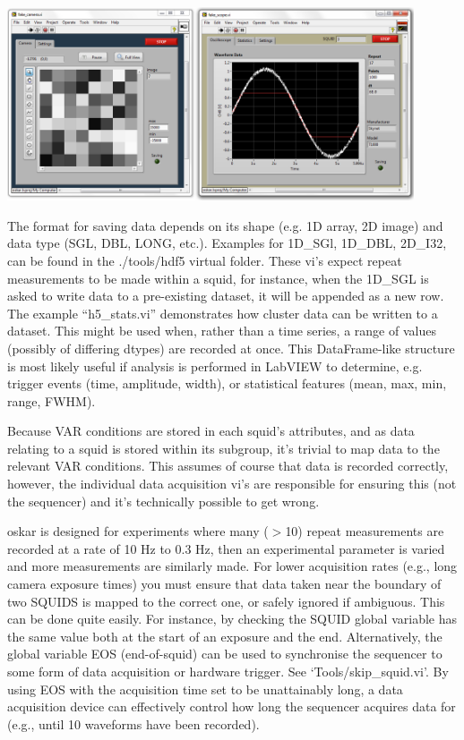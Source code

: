 \documentclass[10pt,a4paper]{article}
\newenvironment{warning}[1]{%
	\tcolorbox[beamer,%
	breakable,
	colback=white,colframe=DarkRed,%
	title=Warning:]}%
{\endtcolorbox}
\begin{document}
\includegraphics[width=0.9\textwidth]{images/DAQ.png}

The format for saving data depends on its shape (e.g. 1D array, 2D image) and data type (SGL, DBL, LONG, etc.).  Examples for 1D\_SGl, 1D\_DBL, 2D\_I32, can be found in the ./tools/hdf5 virtual folder.  These vi's expect repeat measurements to be made within a squid, for instance, when the 1D\_SGL is asked to write data to a pre-existing dataset, it will be appended as a new row.  The example ``h5\_stats.vi'' demonstrates how cluster data can be written to a dataset.  This might be used when, rather than a time series, a range of values (possibly of differing dtypes) are recorded at once.  This DataFrame-like structure is most likely useful if analysis is performed in LabVIEW to determine, e.g. trigger events (time, amplitude, width), or statistical features (mean, max, min, range, FWHM).

Because VAR conditions are stored in each squid's attributes, and as data relating to a squid is stored within its subgroup, it's trivial to map data to the relevant VAR conditions.  This assumes of course that data is recorded correctly, however, the individual data acquisition vi's are responsible for ensuring this (not the sequencer) and it's technically possible to get wrong.

\begin{warning}{}
	oskar is designed for experiments where many ($>$10) repeat measurements are recorded at a rate of 10 Hz to 0.3 Hz, then an experimental parameter is varied and more measurements are similarly made.  For lower acquisition rates (e.g., long camera exposure times) you must ensure that data taken near the boundary of two SQUIDS is mapped to the correct one, or safely ignored if ambiguous.  This can be done quite easily. For instance, by checking the SQUID global variable has the same value both at the start of an exposure and the end.  Alternatively, the global variable EOS (end-of-squid) can be used to synchronise the sequencer to some form of data acquisition or hardware trigger.  See `Tools/skip\_squid.vi'.  By using EOS with the acquisition time set to be unattainably long, a data acquisition device can effectively control how long the sequencer acquires data for (e.g., until 10 waveforms have been recorded).
\end{warning}
\end{document}
